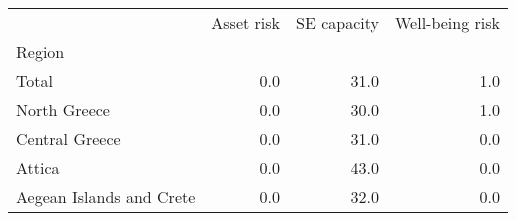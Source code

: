 \begin{tabular}{lrrr}
\toprule
{} &  Asset risk &  SE capacity &  Well-being risk \\
Region                   &             &              &                  \\
\midrule
Total                    &         0.0 &         31.0 &              1.0 \\
North Greece             &         0.0 &         30.0 &              1.0 \\
Central Greece           &         0.0 &         31.0 &              0.0 \\
Attica                   &         0.0 &         43.0 &              0.0 \\
Aegean Islands and Crete &         0.0 &         32.0 &              0.0 \\
\bottomrule
\end{tabular}
